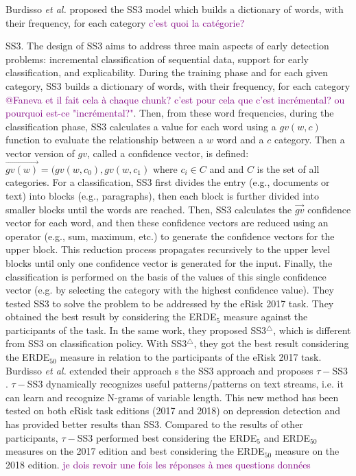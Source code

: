 \documentclass[graybox]{svmult}
\newcommand{\jm}[1]{\textcolor{purple}{{  #1}}}
\begin{document}
Burdisso \textit{et al.} \cite{BurdissoEM19} proposed the SS3 model which builds a dictionary of words, with their frequency, for each category \jm{c'est quoi la catégorie?}


SS3. The design of SS3 aims to address three main aspects of early detection problems: incremental classification of sequential data, support for early classification, and explicability. During the training phase and for each given category, SS3 builds a dictionary of words, with their frequency, for each category \jm{@Faneva et il fait cela à chaque chunk? c'est pour cela que c'est incrémental? ou pourquoi est-ce "incrémental?"}. Then, from these word frequencies, during the classification phase, SS3 calculates a value for each word using a $gv(w,c)$ function to evaluate the relationship between a $w$ word and a $c$ category. Then a vector version of $gv$, called a confidence vector, is defined: $\overrightarrow{gv(w)} = (gv(w,c_0),gv(w,c_1)$ where $c_i \in C$ and and $C$ is the set of all categories. For a classification, SS3 first divides the entry (e.g., documents or text) into blocks (e.g., paragraphs), then each block is further divided into smaller blocks until the words are reached. Then, SS3 calculates the $\overrightarrow{gv}$ confidence vector for each word, and then these confidence vectors are reduced using an operator (e.g., sum, maximum, etc.) to generate the confidence vectors for the upper block. This reduction process propagates recursively to the upper level blocks until only one confidence vector is generated for the input. Finally, the classification is performed on the basis of the values of this single confidence vector (e.g. by selecting the category with the highest confidence value). They tested SS3 to solve the problem to be addressed by the eRisk 2017 task. They obtained the best result by considering the ERDE$_{5}$ measure against the participants of the task. In the same work, they proposed SS3$^{\bigtriangleup}$, which is different from SS3 on classification policy. With SS3$^{\bigtriangleup}$, they got the best result considering the ERDE$_{50}$ measure in relation to the participants of the eRisk 2017 task. 
Burdisso \textit{et al.} extended their approach 
s the SS3 approach \cite{BurdissoEM19} and proposes $\tau-$SS3 \cite{BurdissoEM19B}. $\tau-$SS3 dynamically recognizes useful patterns/patterns on text streams, i.e. it can learn and recognize N-grams of variable length. This new method has been tested on both eRisk task editions (2017 and 2018) on depression detection and has provided better results than SS3. Compared to the results of other participants, $\tau-$SS3 performed best considering the ERDE$_{5}$ and ERDE$_{50}$ measures on the 2017 edition and best considering the ERDE$_{50}$ measure on the 2018 edition. \jm{je dois revoir une fois les réponses à mes questions données}
\end{document}
